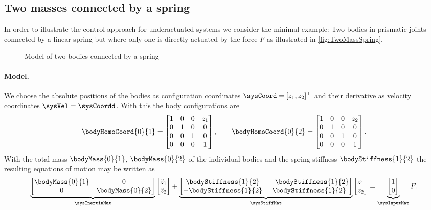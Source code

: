 \subsection{Two masses connected by a spring}
In order to illustrate the control approach for underactuated systems we consider the minimal example:
Two bodies in prismatic joints connected by a linear spring but where only one is directly actuated by the force $F$ as illustrated in \autoref{fig:TwoMassSpring}.
\begin{figure}[ht]
 \centering
 
 \caption{Model of two bodies connected by a spring}
 \label{fig:TwoMassSpring}
\end{figure}

\paragraph{Model.}
We choose the absolute positions of the bodies as configuration coordinates $\sysCoord = [z_1, z_2]^\top$ and their derivative as velocity coordinates $\sysVel = \sysCoordd$.
With this the body configurations are
\begin{align}
 \bodyHomoCoord{0}{1} = \begin{bmatrix} 1 & 0 & 0 & z_1 \\ 0 & 1 & 0 & 0 \\ 0 & 0 & 1 & 0 \\ 0 & 0 & 0 & 1\end{bmatrix},
\qquad
 \bodyHomoCoord{0}{2} = \begin{bmatrix} 1 & 0 & 0 & z_2 \\ 0 & 1 & 0 & 0 \\ 0 & 0 & 1 & 0 \\ 0 & 0 & 0 & 1\end{bmatrix}.
\end{align}
With the total mass $\bodyMass{0}{1}$, $\bodyMass{0}{2}$ of the individual bodies and the spring stiffness $\bodyStiffness{1}{2}$ the resulting equations of motion may be written as
\begin{align}\label{eq:TwoMassSpringModel}
 \underbrace{\begin{bmatrix} \bodyMass{0}{1} & 0 \\ 0 & \bodyMass{0}{2} \end{bmatrix}}_{\sysInertiaMat}
 \begin{bmatrix} \ddot{z}_1 \\ \ddot{z}_2 \end{bmatrix}
 +
 \underbrace{\begin{bmatrix} \bodyStiffness{1}{2} & -\bodyStiffness{1}{2} \\ -\bodyStiffness{1}{2} & \bodyStiffness{1}{2} \end{bmatrix}}_{\sysStiffMat}
 \begin{bmatrix} z_1 \\ z_2 \end{bmatrix} 
 =
 \underbrace{\begin{bmatrix} 1 \\ 0 \end{bmatrix}}_{\sysInputMat} F
 .
\end{align}
